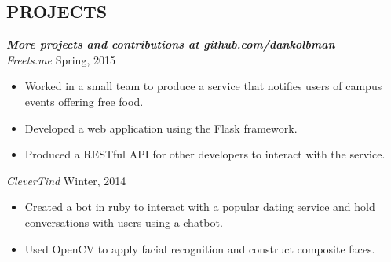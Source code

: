 \documentclass[margin]{res}
\begin{document}
\begin{resume}
\section{PROJECTS}
  {\sl \textbf{More projects and contributions at github.com/dankolbman}}\\
  {\sl Freets.me} \hfill            Spring, 2015 \\
  \begin{itemize}
    \item Worked in a small team to produce a service that notifies users of 
        campus events offering free food.
    \item Developed a web application using the Flask framework.
    \item Produced a RESTful API for other developers to interact with the service.
  \end{itemize}
  {\sl CleverTind} \hfill            Winter, 2014 \\
  \begin{itemize}
    \item Created a bot in ruby to interact with a popular dating service and hold
      conversations with users using a chatbot.
    \item Used OpenCV to apply facial recognition and construct composite faces.
  \end{itemize}



\end{resume}
\end{document}
